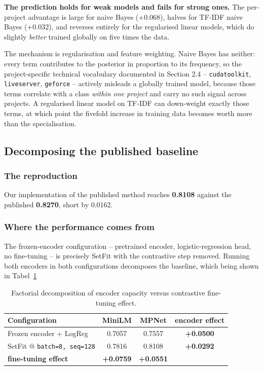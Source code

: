 \textbf{The prediction holds for weak models and fails for strong ones.} The per-project advantage is large for naive Bayes (+0.068), halves for TF-IDF naive Bayes (+0.032), and reverses entirely for the regularised linear models, which do slightly \textit{better} trained globally on five times the data.

The mechanism is regularisation and feature weighting. Naive Bayes has neither: every term contributes to the posterior in proportion to its frequency, so the project-specific technical vocabulary documented in Section 2.4 -- \texttt{cudatoolkit}, \texttt{liveserver}, \texttt{geforce} -- actively misleads a globally trained model, because those terms correlate with a class \textit{within one project} and carry no such signal across projects. A regularised linear model on TF-IDF can down-weight exactly those terms, at which point the fivefold increase in training data becomes worth more than the specialisation.

\subsection{Decomposing the published baseline}

\subsubsection{The reproduction}

Our implementation of the published method reaches \textbf{0.8108} against the published \textbf{0.8270}, short by 0.0162.

\subsubsection{Where the performance comes from}

The frozen-encoder configuration -- pretrained encoder, logistic-regression head, no fine-tuning -- is precisely SetFit with the contrastive step removed. Running both encoders in both configurations decomposes the baseline, which being shown in Tabel~\ref{tab:baseline_decomposition}

\begin{table}[H]
\centering
\caption{Factorial decomposition of encoder capacity versus contrastive fine-tuning effect.}
\label{tab:baseline_decomposition}
\vspace{0.5em}
\begin{tabular}{l c c c}
\hline
Configuration & MiniLM & MPNet & encoder effect \\
\hline
Frozen encoder + LogReg & 0.7057 & 0.7557 & \textbf{+0.0500} \\
SetFit @ \texttt{batch=8, seq=128} & 0.7816 & 0.8108 & \textbf{+0.0292} \\
\textbf{fine-tuning effect} & \textbf{+0.0759} & \textbf{+0.0551} & \\
\hline
\end{tabular}
\end{table}

